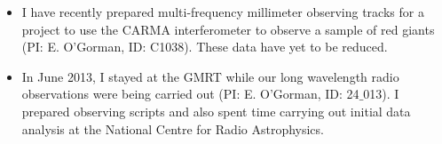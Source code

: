 \documentclass[11pt]{letter} %
\begin{document}
\begin{itemize}
    \item I have recently prepared multi-frequency millimeter observing tracks for a project to use the CARMA interferometer to observe a sample of red giants (PI: E. O'Gorman, ID: C1038). These data have yet to be reduced.\\ 
    
    \item In June 2013, I stayed at the GMRT while our long wavelength radio observations were being carried out (PI: E. O'Gorman, ID: 24$\_$013). I prepared observing scripts and also spent time carrying out initial data analysis at the National Centre for Radio Astrophysics.\\
      
   
   \end{itemize}
\end{document}
